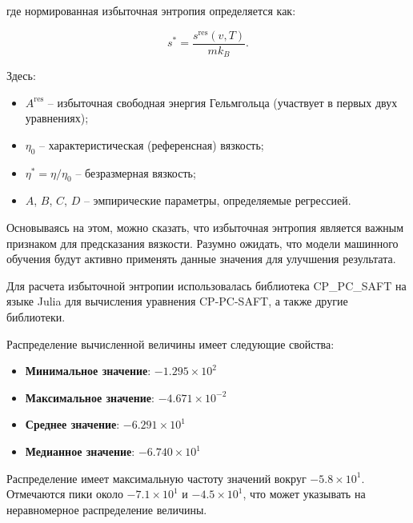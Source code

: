 \documentclass[a4paper,12pt]{article}
\begin{document}
      где нормированная избыточная энтропия определяется как:
      
      \begin{equation}
      s^* = \frac{s^{\text{res}}(v, T)}{m k_B}.
      \end{equation}
      
      Здесь:
      
      \begin{itemize}
        \item $A^{\text{res}}$ -- избыточная свободная энергия Гельмгольца (участвует в первых двух уравнениях);
        \item $\eta_0$ -- характеристическая (референсная) вязкость;
        \item $\eta^* = \eta / \eta_0$ -- безразмерная вязкость;
        \item $A$, $B$, $C$, $D$ -- эмпирические параметры, определяемые регрессией.
      \end{itemize}

      Основываясь на этом, можно сказать, что избыточная энтропия является важным признаком для предсказания вязкости. Разумно ожидать, что модели машинного обучения будут активно применять данные значения для улучшения результата.

      Для расчета избыточной энтропии использовалась библиотека CP\_PC\_SAFT на языке Julia для вычисления уравнения CP-PC-SAFT, а также другие библиотеки.

      Распределение вычисленной величины имеет следующие свойства:

      \begin{itemize}
          \item \textbf{Минимальное значение}: \(-1.295 \times 10^{2}\)
          \item \textbf{Максимальное значение}: \(-4.671 \times 10^{-2}\)
          \item \textbf{Среднее значение}: \(-6.291 \times 10^{1}\)
          \item \textbf{Медианное значение}: \(-6.740 \times 10^{1}\)
      \end{itemize}
      
      Распределение имеет максимальную частоту значений вокруг \(-5.8 \times 10^{1}\). Отмечаются пики около \(-7.1 \times 10^{1}\) и \(-4.5 \times 10^{1}\), что может указывать на неравномерное распределение величины.
      
\end{document}
